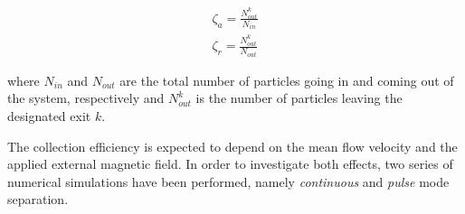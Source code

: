 \begin{eqnarray}
	\zeta_{a} = \frac{N_{out}^{k}}{N_{in}}\\
	\zeta_{r} = \frac{N_{out}^{k}}{N_{out}}
	\label{eqn:separationEfficiency}
\end{eqnarray}

where $N_{in}$ and $N_{out}$ are the total number of particles going in and coming out of the system, respectively and $N_{out}^{k}$ is the number of particles leaving the designated exit $k$.


The collection efficiency is expected to depend on the mean flow velocity and the applied external magnetic field. In order to investigate both effects, two series of numerical simulations have been performed, namely \textit{continuous} and \textit{pulse} mode separation.


